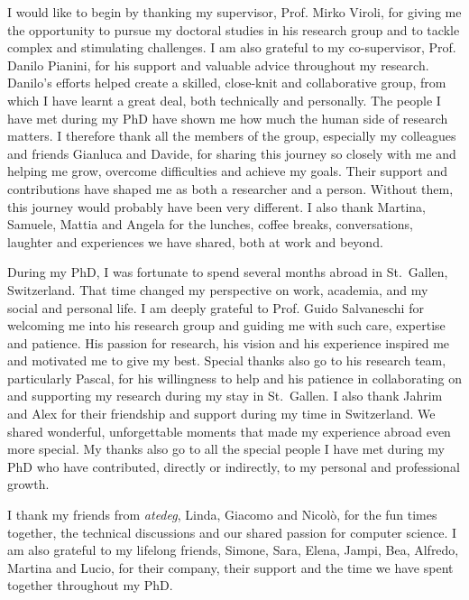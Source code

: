 \documentclass[12pt,a4paper,openright,twoside]{book}
\theoremstyle{definition}
\begin{document}
\begin{acknowledgements}
I would like to begin by thanking my supervisor, Prof. Mirko Viroli, for giving me the opportunity to pursue my doctoral studies in his research group and to tackle complex and stimulating challenges.
%
I am also grateful to my co-supervisor, Prof. Danilo Pianini, for his support and valuable advice throughout my research.
%
Danilo's efforts helped create a skilled, close-knit and collaborative group, from which I have learnt a great deal, both technically and personally.
%
The people I have met during my PhD have shown me how much the human side of research matters.
%
I therefore thank all the members of the group, especially my colleagues and friends Gianluca and Davide, for sharing this journey so closely with me and helping me grow, overcome difficulties and achieve my goals.
%
Their support and contributions have shaped me as both a researcher and a person.
%
Without them, this journey would probably have been very different.
%
I also thank Martina, Samuele, Mattia and Angela for the lunches, coffee breaks, conversations, laughter and experiences we have shared, both at work and beyond.

During my PhD, I was fortunate to spend several months abroad in St.~Gallen, Switzerland.
%
That time changed my perspective on work, academia, and my social and personal life.
%
I am deeply grateful to Prof. Guido Salvaneschi for welcoming me into his research group and guiding me with such care, expertise and patience.
%
His passion for research, his vision and his experience inspired me and motivated me to give my best.
%
Special thanks also go to his research team, particularly Pascal, for his willingness to help and his patience in collaborating on and supporting my research during my stay in St.~Gallen.
%
I also thank Jahrim and Alex for their friendship and support during my time in Switzerland.
%
We shared wonderful, unforgettable moments that made my experience abroad even more special.
%
My thanks also go to all the special people I have met during my PhD who have contributed, directly or indirectly, to my personal and professional growth.

I thank my friends from \emph{atedeg}, Linda, Giacomo and Nicolò, for the fun times together, the technical discussions and our shared passion for computer science.
%
I am also grateful to my lifelong friends, Simone, Sara, Elena, Jampi, Bea, Alfredo, Martina and Lucio, for their company, their support and the time we have spent together throughout my PhD.


\end{acknowledgements}
\end{document}
